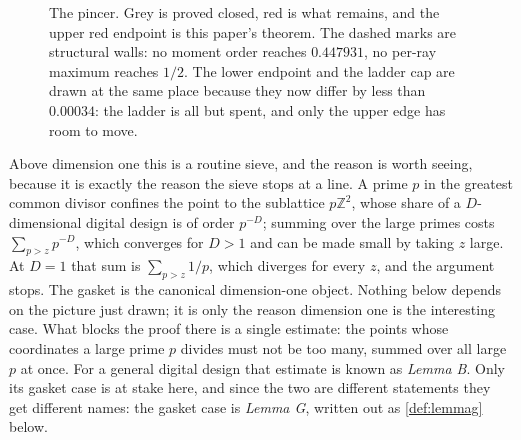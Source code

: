 \documentclass[11pt]{amsart}
\theoremstyle{definition}
\theoremstyle{remark}
\begin{document}
\begin{figure}[h]
\centering
{}
\caption{The pincer. Grey is proved closed, red is what remains, and the upper red endpoint is this paper's theorem. The dashed marks are structural walls: no moment order reaches $0.447931$, no per-ray maximum reaches $1/2$. The lower endpoint and the ladder cap are drawn at the same place because they now differ by less than $0.00034$: the ladder is all but spent, and only the upper edge has room to move.}
\label{fig:pincer}
\end{figure}

Above dimension one this is a routine sieve, and the reason is worth seeing, because it is exactly the reason the sieve stops at a line. A prime $p$ in the greatest common divisor confines the point to the sublattice $p\mathbb Z^2$, whose share of a $D$-dimensional digital design is of order $p^{-D}$; summing over the large primes costs $\sum_{p > z} p^{-D}$, which converges for $D > 1$ and can be made small by taking $z$ large. At $D = 1$ that sum is $\sum_{p>z} 1/p$, which diverges for every $z$, and the argument stops. The gasket is the canonical dimension-one object. Nothing below depends on the picture just drawn; it is only the reason dimension one is the interesting case. What blocks the proof there is a single estimate: the points whose coordinates a large prime $p$ divides must not be too many, summed over all large $p$ at once. For a general digital design that estimate is known as \emph{Lemma B}. Only its gasket case is at stake here, and since the two are different statements they get different names: the gasket case is \emph{Lemma G}, written out as \cref{def:lemmag} below.
\end{document}
